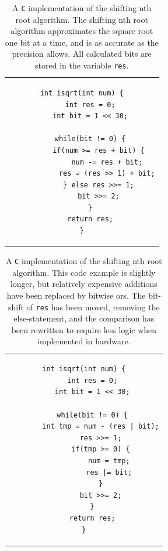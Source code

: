 			\begin{table}
				\centering
				\caption{A \texttt{C} implementation of the shifting nth root 
					algorithm. The shifting nth root algorithm approximates the
					square root one bit at a time, and is as accurate as the 
					precision allows. All calculated bits are stored in the 
					variable \texttt{res}.}
				\label{sqrtc}
				\begin{tabular}{c}
				\begin{lstlisting}
int isqrt(int num) {
    int res = 0;
    int bit = 1 << 30;

    while(bit != 0) {
        if(num >= res + bit) {
            num -= res + bit;
            res = (res >> 1) + bit;
        } else res >>= 1;
        bit >>= 2;
    }
    return res;
}
				\end{lstlisting}
				\end{tabular}
			\end{table}

			\begin{table}
				\centering
				\caption{A \texttt{C} implementation of the shifting nth root
					algorithm. This code example is slightly longer, but
					relatively expensive additions have been replaced by
					bitwise ors. The bit-shift of \texttt{res} has been moved, 
					removing the else-statement, and the comparison has been 
					rewritten to require less logic when implemented in 
					hardware.}
				\label{sqrtcopt}
				\begin{tabular}{c}
				\begin{lstlisting}
int isqrt(int num) {
    int res = 0;
    int bit = 1 << 30;

    while(bit != 0) {
        int tmp = num - (res | bit);
        res >>= 1;
        if(tmp >= 0) {
            num = tmp;
            res |= bit;
        }
        bit >>= 2;
    }
    return res;
}
				\end{lstlisting}
				\end{tabular}
			\end{table}

